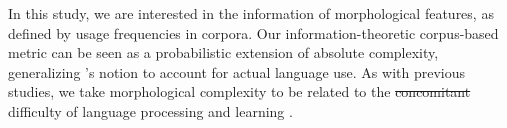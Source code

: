 \documentclass[USenglish]{article}
\makeatletter
\providecommand{\DIFdeltex}[1]{{\protect\color{red}\sout{#1}}} %
\providecommand{\DIFdelbegin}{} %
\providecommand{\DIFdelend}{} %
\providecommand{\DIFdel}[1]{\texorpdfstring{\DIFdeltex{#1}}{}} %
\providecommand{\DIFscaledelfig}{0.5}
\newlength{\DIFdelgraphicswidth} %
\newlength{\DIFdelgraphicsheight} %
\providecommand{\DIFdelincludegraphics}[2][]{%
\sbox{\DIFdelgraphicsbox}{\DIFOincludegraphics[#1]{#2}}%
\settoboxwidth{\DIFdelgraphicswidth}{\DIFdelgraphicsbox} %
\settoboxtotalheight{\DIFdelgraphicsheight}{\DIFdelgraphicsbox} %
\scalebox{\DIFscaledelfig}{%
\parbox[b]{\DIFdelgraphicswidth}{\usebox{\DIFdelgraphicsbox}\\[-\baselineskip] \rule{\DIFdelgraphicswidth}{0em}}\llap{\resizebox{\DIFdelgraphicswidth}{\DIFdelgraphicsheight}{%
\setlength{\unitlength}{\DIFdelgraphicswidth}%
\begin{picture}(1,1)%
\thicklines\linethickness{2pt} %
{\color[rgb]{1,0,0}\put(0,0){\framebox(1,1){}}}%
{\color[rgb]{1,0,0}\put(0,0){\line( 1,1){1}}}%
{\color[rgb]{1,0,0}\put(0,1){\line(1,-1){1}}}%
\end{picture}%
}\hspace*{3pt}}} %
} %
\DeclareRobustCommand{\DIFdelbegin}{\DIFOdelbegin \let\includegraphics\DIFdelincludegraphics} %
\DeclareRobustCommand{\DIFdelend}{\DIFOaddend \let\includegraphics\DIFOincludegraphics} %
\let\sout@orig\sout %
\renewcommand{\sout}[1]{\ifmmode\text{\sout@orig{\ensuremath{#1}}}\else\sout@orig{#1}\fi} %
\makeatother
\begin{document}


\DIFdelend In this study, we are interested in the information of morphological features, as defined by usage frequencies in corpora.
Our information-theoretic corpus-based metric can be seen as a probabilistic extension of absolute complexity, generalizing \citet{miestamo_feasibility_2006, miestamo_grammatical_2008}’s notion to account for actual language use.
As with previous studies, we take morphological complexity to be related to the \DIFdelbegin \DIFdel{concomitant }\DIFdelend difficulty of language processing and learning \citep{findlay_effects_1995, cohen-mimran_effect_2013, mehravari_effects_2015, bentz_learning_2016}.
\end{document}
